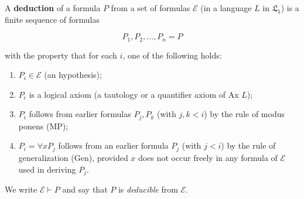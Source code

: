 A \textbf{deduction} of a formula $P$ from a set of formulas $\mathcal{E}$ (in a language $L$ in $\mathfrak{L}_1$) is a finite sequence of formulas

$$P_1, P_2, \ldots, P_n = P$$

with the property that for each $i$, one of the following holds:
\begin{enumerate}
\item $P_i \in \mathcal{E}$ (an hypothesis);
\item $P_i$ is a logical axiom (a tautology or a quantifier axiom of $\text{Ax } L$);
\item $P_i$ follows from earlier formulas $P_j, P_k$ (with $j, k < i$) by the rule of modus ponens (MP);
\item $P_i = \forall x P_j$ follows from an earlier formula $P_j$ (with $j < i$) by the rule of generalization (Gen), provided $x$ does not occur freely in any formula of $\mathcal{E}$ used in deriving $P_j$.
\end{enumerate}

We write $\mathcal{E} \vdash P$ and say that $P$ is \textit{deducible} from $\mathcal{E}$.
